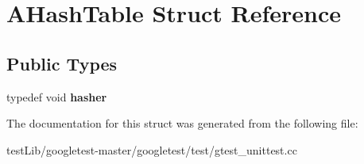 \hypertarget{structAHashTable}{}\section{A\+Hash\+Table Struct Reference}
\label{structAHashTable}
\subsection*{Public Types}
\begin{DoxyCompactItemize}
\item 
\mbox{\label{structAHashTable_af0df4ce57a783be396e80cb8df6b6259}} 
typedef void {\bfseries hasher}
\end{DoxyCompactItemize}


The documentation for this struct was generated from the following file\+:\begin{DoxyCompactItemize}
\item 
test\+Lib/googletest-\/master/googletest/test/gtest\+\_\+unittest.\+cc\end{DoxyCompactItemize}
